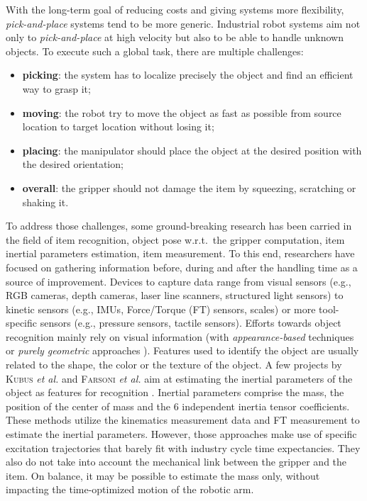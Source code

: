 \documentclass[/home/francois/latex/report/main.tex]{subfiles}
\begin{document}
With the long-term goal of reducing costs and giving systems more flexibility, \textit{pick-and-place} systems tend to be more generic. Industrial robot systems aim not only to \textit{pick-and-place} at high velocity but also to be able to handle unknown objects. To execute such a global task, there are multiple challenges:
\begin{itemize}
    \item \textbf{picking}: the system has to localize precisely the object and find an efficient way to grasp it;
    \item \textbf{moving}: the robot try to move the object as fast as possible from source location to target location without losing it;
    \item \textbf{placing}: the manipulator should place the object at the desired position with the desired orientation;
    \item \textbf{overall}: the gripper should not damage the item by squeezing, scratching or shaking it.
\end{itemize}

To address those challenges, some ground-breaking research has been carried in the field of item recognition, object pose w.r.t.\ the gripper computation, item inertial parameters estimation, item measurement. To this end, researchers have focused on gathering information before, during and after the handling time as a source of improvement. Devices to capture data range from visual sensors (e.g., RGB cameras, depth cameras, laser line scanners, structured light sensors) to kinetic sensors (e.g., \ac{IMUs}, Force/Torque (FT) sensors, scales) or more tool-specific sensors (e.g., pressure sensors, tactile sensors). Efforts towards object recognition mainly rely on visual information (with \textit{appearance-based} techniques \cite{Carmichael2002, Schmid1997, Viola2001, Murase1993} or \textit{purely geometric} approaches \cite{Hut1987, Sethi2001}). Features used to identify the object are usually related to the shape, the color or the texture of the object. A few projects by \textsc{Kubus} \textit{et al.} and \textsc{Farsoni} \textit{et al.} aim at estimating the inertial parameters of the object as features for recognition \cite{Kubus2008, Kubus2007, Kubus2014, Farsoni2018}. Inertial parameters comprise the mass, the position of the center of mass and the 6 independent inertia tensor coefficients. These methods utilize the kinematics measurement data and \ac{FT} measurement to estimate the inertial parameters. However, those approaches make use of specific excitation trajectories that barely fit with industry cycle time expectancies. They also do not take into account the mechanical link between the gripper and the item. On balance, it may be possible to estimate the mass only, without impacting the time-optimized motion of the robotic arm.
\end{document}
